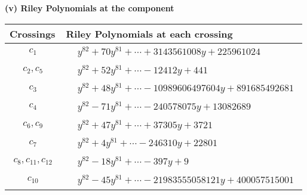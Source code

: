 \documentclass[1p]{elsarticle_modified}
\theoremstyle{definition}
\begin{document}
\newpage\renewcommand{\arraystretch}{1}
\flushleft \textbf{(v) Riley Polynomials at the component}\newline \\
\begin{tabular}{m{50pt}|m{274pt}}
Crossings & \hspace{64pt}Riley Polynomials at each crossing \\
\hline $$\begin{aligned}c_{1}\end{aligned}$$&$\begin{aligned}
&y^{82}+70 y^{81}+\cdots+3143561008 y+225961024
\end{aligned}$\\
\hline $$\begin{aligned}c_{2},c_{5}\end{aligned}$$&$\begin{aligned}
&y^{82}+52 y^{81}+\cdots-12412 y+441
\end{aligned}$\\
\hline $$\begin{aligned}c_{3}\end{aligned}$$&$\begin{aligned}
&y^{82}+48 y^{81}+\cdots-10989606497604 y+891685492681
\end{aligned}$\\
\hline $$\begin{aligned}c_{4}\end{aligned}$$&$\begin{aligned}
&y^{82}-71 y^{81}+\cdots-240578075 y+13082689
\end{aligned}$\\
\hline $$\begin{aligned}c_{6},c_{9}\end{aligned}$$&$\begin{aligned}
&y^{82}+47 y^{81}+\cdots+37305 y+3721
\end{aligned}$\\
\hline $$\begin{aligned}c_{7}\end{aligned}$$&$\begin{aligned}
&y^{82}+4 y^{81}+\cdots-246310 y+22801
\end{aligned}$\\
\hline $$\begin{aligned}c_{8},c_{11},c_{12}\end{aligned}$$&$\begin{aligned}
&y^{82}-18 y^{81}+\cdots-397 y+9
\end{aligned}$\\
\hline $$\begin{aligned}c_{10}\end{aligned}$$&$\begin{aligned}
&y^{82}-45 y^{81}+\cdots-21983555058121 y+400057515001
\end{aligned}$\\
\hline
\end{tabular}\\~\\
\end{document}
